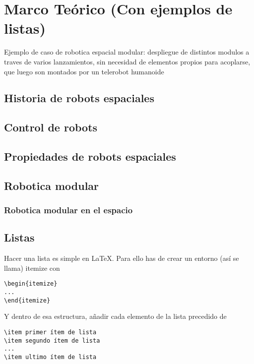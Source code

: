 
\chapter{Marco Teórico (Con ejemplos de listas)}
\label{marcoteorico}

Ejemplo de caso de robotica espacial modular: despliegue de distintos modulos a traves de varios lanzamientos, sin necesidad de elementos propios para acoplarse, que luego son montados por un telerobot humanoide

\section{Historia de robots espaciales}

\section{Control de robots}

\section{Propiedades de robots espaciales}

\section{Robotica modular}

\subsection{Robotica modular en el espacio}



\section{Listas}
Hacer una lista es simple en \LaTeX. Para ello has de crear un entorno (así se llama) itemize con
\begin{lstlisting}[style=Latex-color]
\begin{itemize}
...
\end{itemize}
\end{lstlisting}
Y dentro de esa estructura, añadir cada elemento de la lista precedido de 
\begin{lstlisting}[style=Latex-color]
\item primer ítem de lista
\item segundo ítem de lista
...
\item ultimo ítem de lista
\end{lstlisting}

